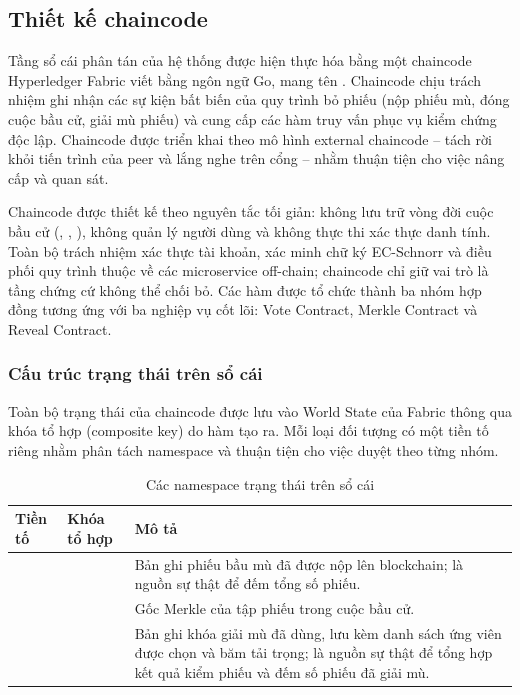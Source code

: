 \subsection{Thiết kế chaincode}

Tầng sổ cái phân tán của hệ thống được hiện thực hóa bằng một chaincode Hyperledger Fabric viết bằng ngôn ngữ Go, mang tên . Chaincode chịu trách nhiệm ghi nhận các sự kiện bất biến của quy trình bỏ phiếu (nộp phiếu mù, đóng cuộc bầu cử, giải mù phiếu) và cung cấp các hàm truy vấn phục vụ kiểm chứng độc lập. Chaincode được triển khai theo mô hình external chaincode -- tách rời khỏi tiến trình của peer và lắng nghe trên cổng  -- nhằm thuận tiện cho việc nâng cấp và quan sát.

Chaincode được thiết kế theo nguyên tắc tối giản: không lưu trữ vòng đời cuộc bầu cử (, , ), không quản lý người dùng và không thực thi xác thực danh tính. Toàn bộ trách nhiệm xác thực tài khoản, xác minh chữ ký EC-Schnorr và điều phối quy trình thuộc về các microservice off-chain; chaincode chỉ giữ vai trò là tầng chứng cứ không thể chối bỏ. Các hàm được tổ chức thành ba nhóm hợp đồng tương ứng với ba nghiệp vụ cốt lõi: Vote Contract, Merkle Contract và Reveal Contract.

\subsubsection{Cấu trúc trạng thái trên sổ cái}

Toàn bộ trạng thái của chaincode được lưu vào World State của Fabric thông qua khóa tổ hợp (composite key) do hàm  tạo ra. Mỗi loại đối tượng có một tiền tố riêng nhằm phân tách namespace và thuận tiện cho việc duyệt theo từng nhóm.

\begin{table}[H]
    \centering
    \small
    \setlength{\tabcolsep}{3pt}
    \caption{Các namespace trạng thái trên sổ cái}
    \label{tab:cc-state-prefix}
    \begin{tabularx}{\textwidth}{|L{0.25}|L{0.25}|L{0.50}|}
    \hline
    \textbf{Tiền tố} & \textbf{Khóa tổ hợp} & \textbf{Mô tả} \\
    \hline
           & \allowbreak{}\allowbreak{} & Bản ghi phiếu bầu mù đã được nộp lên blockchain; là nguồn sự thật để đếm tổng số phiếu. \\ \hline
           &         & Gốc Merkle của tập phiếu trong cuộc bầu cử. \\ \hline
     & \allowbreak{}\allowbreak{}\allowbreak{} & Bản ghi khóa giải mù đã dùng, lưu kèm danh sách ứng viên được chọn và băm tải trọng; là nguồn sự thật để tổng hợp kết quả kiểm phiếu và đếm số phiếu đã giải mù. \\ \hline
    \end{tabularx}
\end{table}

